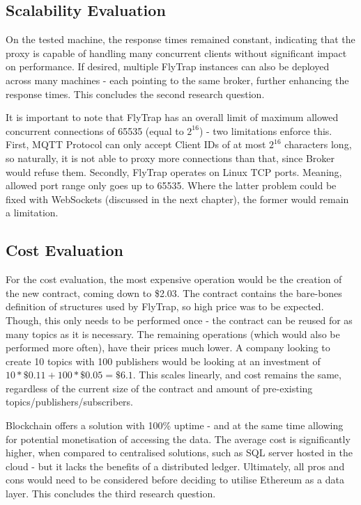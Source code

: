 \subsection{Scalability Evaluation}
On the tested machine, the response times remained constant, indicating that the proxy is capable of handling many concurrent clients without significant impact on performance. If desired, multiple FlyTrap instances can also be deployed across many machines - each pointing to the same broker, further enhancing the response times. This concludes the second research question.

It is important to note that FlyTrap has an overall limit of maximum allowed concurrent connections of 65535 (equal to $2^{16}$) - two limitations enforce this. First, MQTT Protocol can only accept Client IDs of at most $2^{16}$ characters long, so naturally, it is not able to proxy more connections than that, since Broker would refuse them. Secondly, FlyTrap operates on Linux TCP ports. Meaning, allowed port range only goes up to 65535. Where the latter problem could be fixed with WebSockets (discussed in the next chapter), the former would remain a limitation.
\subsection{Cost Evaluation}
For the cost evaluation, the most expensive operation would be the creation of the new contract, coming down to \$2.03. The contract contains the bare-bones definition of structures used by FlyTrap, so high price was to be expected. Though, this only needs to be performed once - the contract can be reused for as many topics as it is necessary. The remaining operations (which would also be performed more often), have their prices much lower. A company looking to create 10 topics with 100 publishers would be looking at an investment of $10 * \$0.11 + 100 * \$0.05 = \$6.1$. This scales linearly, and cost remains the same, regardless of the current size of the contract and amount of pre-existing topics/publishers/subscribers.

Blockchain offers a solution with 100\% uptime - and at the same time allowing for potential monetisation of accessing the data. The average cost is significantly higher, when compared to centralised solutions, such as SQL server hosted in the cloud - but it lacks the benefits of a distributed ledger. Ultimately, all pros and cons would need to be considered before deciding to utilise Ethereum as a data layer. This concludes the third research question.
